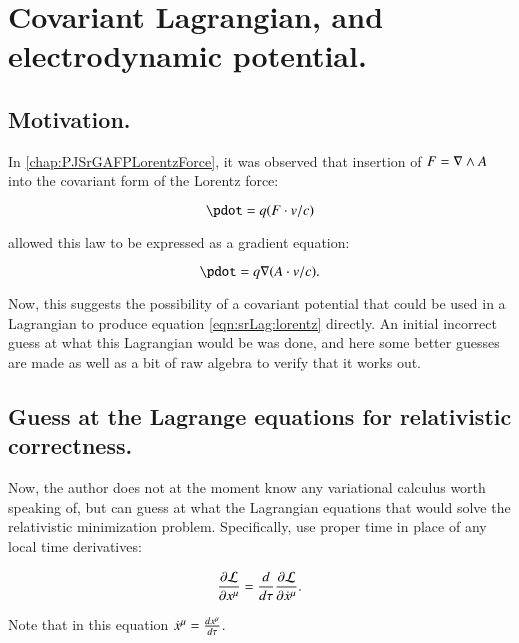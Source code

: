 \chapter{Covariant Lagrangian, and electrodynamic potential.}\label{chap:PJSrLagrangian}
\date{August 21, 2008.  $RCSfile: srLagrangian.tex,v $ Last $Revision: 1.11 $ $Date: 2009/06/11 16:45:58 $ }

\section{Motivation. }

In \ref{chap:PJSrGAFPLorentzForce}, it was observed that insertion of $F = \nabla \wedge A$ into
the covariant form of the Lorentz force:

\begin{equation}\label{eqn:srLag:lorentz}
\pdot = q (F \cdot v/c)
\end{equation}

allowed this law to be expressed as a gradient equation:

\begin{equation}
\pdot = q \grad (A \cdot v/c).
\end{equation}

Now, this suggests the possibility of a covariant potential that could be 
used in a Lagrangian to produce equation \ref{eqn:srLag:lorentz} directly.  An
initial incorrect guess at what this Lagrangian would be was done, and
here some better guesses are made as well as a bit of raw algebra to verify
that it works out.

\section{Guess at the Lagrange equations for relativistic correctness. }

Now, the author does not at the moment know any variational calculus worth
speaking of, but can guess at what the Lagrangian equations that would 
solve the relativistic minimization problem.  Specifically, use proper
time in place of any local time derivatives:

\begin{equation}\label{eqn:srLag:properLagrange}
\frac{\partial \mathcal{L}}{\partial x^{\mu}} = 
\frac{d}{d\tau} \frac{\partial \mathcal{L}}{\partial \dot{x}^{\mu}}.
\end{equation}

Note that in this equation $\dot{x}^{\mu} = \frac{d x^{\mu}}{d\tau}$.


